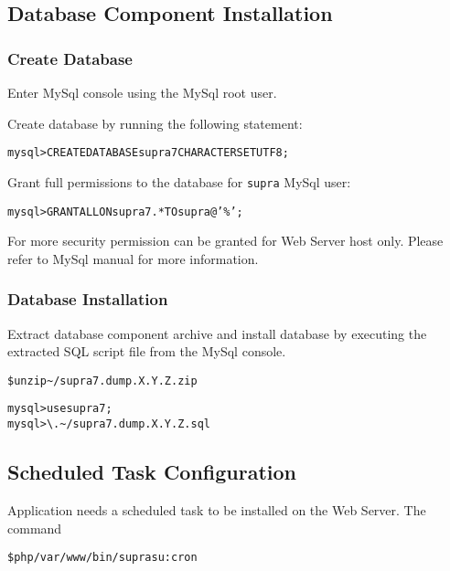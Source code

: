 \documentclass[12pt]{article}
\newcommand{\vigProjectNameShort}{supra7}
\newcommand{\vigPackageName}{supra7}
\newcommand{\vigPathToProject}{/var/www}
\newcommand{\vigReleasePath}{\textasciitilde/}
\newcommand{\vigReleaseVersion}{X.Y.Z}
\begin{document}
\subsection{Database Component Installation}

\subsubsection{Create Database}

Enter MySql console using the MySql root user.

Create database by running the following statement:

\begin{alltt}
mysql> CREATE DATABASE \vigProjectNameShort CHARACTER SET UTF8;
\end{alltt}

Grant full permissions to the database for \texttt{supra} MySql user:

\begin{alltt}
mysql> GRANT ALL ON \vigProjectNameShort.* TO supra@'\%';
\end{alltt}

For more security permission can be granted for Web Server host only. Please refer to MySql manual for more information.

\subsubsection{Database Installation}
Extract database component archive and install database by executing the extracted SQL script file from the MySql console.

\begin{alltt}
\$ unzip {\vigReleasePath}{\vigPackageName}.dump.\vigReleaseVersion.zip
\end{alltt}

\begin{alltt}
mysql> use \vigProjectNameShort;
mysql> \textbackslash. {\vigReleasePath}{\vigPackageName}.dump.\vigReleaseVersion.sql
\end{alltt}

\subsection{Scheduled Task Configuration}

Application needs a scheduled task to be installed on the Web Server. The command

\begin{alltt}
\$ php \vigPathToProject/bin/supra su:cron
\end{alltt}
\end{document}
